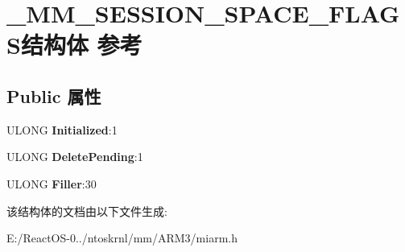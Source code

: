 \hypertarget{struct___m_m___s_e_s_s_i_o_n___s_p_a_c_e___f_l_a_g_s}{}\section{\+\_\+\+M\+M\+\_\+\+S\+E\+S\+S\+I\+O\+N\+\_\+\+S\+P\+A\+C\+E\+\_\+\+F\+L\+A\+G\+S结构体 参考}
\label{struct___m_m___s_e_s_s_i_o_n___s_p_a_c_e___f_l_a_g_s}
\subsection*{Public 属性}
\begin{DoxyCompactItemize}
\item 
\mbox{\label{struct___m_m___s_e_s_s_i_o_n___s_p_a_c_e___f_l_a_g_s_ac77488514c3713f801a45f0d88ea5146}} 
U\+L\+O\+NG {\bfseries Initialized}\+:1
\item 
\mbox{\label{struct___m_m___s_e_s_s_i_o_n___s_p_a_c_e___f_l_a_g_s_ac706b4f8b2a287a24af329b2f84eb89c}} 
U\+L\+O\+NG {\bfseries Delete\+Pending}\+:1
\item 
\mbox{\label{struct___m_m___s_e_s_s_i_o_n___s_p_a_c_e___f_l_a_g_s_afa0dfe425cbbd21c6b536c0960b9587e}} 
U\+L\+O\+NG {\bfseries Filler}\+:30
\end{DoxyCompactItemize}


该结构体的文档由以下文件生成\+:\begin{DoxyCompactItemize}
\item 
E\+:/\+React\+O\+S-\/0../ntoskrnl/mm/\+A\+R\+M3/miarm.\+h\end{DoxyCompactItemize}
